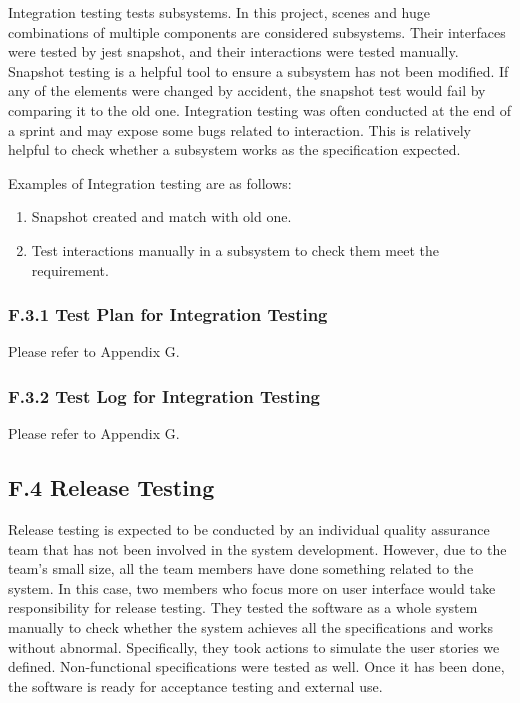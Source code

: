 \documentclass[
]{article}
\begin{document}
Integration testing tests subsystems. In this project, scenes and huge
combinations of multiple components are considered subsystems. Their
interfaces were tested by jest snapshot, and their interactions were
tested manually. Snapshot testing is a helpful tool to ensure a
subsystem has not been modified. If any of the elements were changed by
accident, the snapshot test would fail by comparing it to the old one.
Integration testing was often conducted at the end of a sprint and may
expose some bugs related to interaction. This is relatively helpful to
check whether a subsystem works as the specification expected.

Examples of Integration testing are as follows:

\begin{enumerate}
\def\labelenumi{\arabic{enumi}.}
\item
  Snapshot created and match with old one.
\item
  Test interactions manually in a subsystem to check them meet the
  requirement.
\end{enumerate}

\hypertarget{header-n34}{%
\subsubsection{F.3.1 Test Plan for Integration
Testing}\label{header-n34}}

Please refer to Appendix G.

\hypertarget{header-n36}{%
\subsubsection{F.3.2 Test Log for Integration
Testing}\label{header-n36}}

Please refer to Appendix G.

\hypertarget{header-n39}{%
\subsection{F.4 Release Testing}\label{header-n39}}

Release testing is expected to be conducted by an individual quality
assurance team that has not been involved in the system development.
However, due to the team's small size, all the team members have done
something related to the system. In this case, two members who focus
more on user interface would take responsibility for release testing.
They tested the software as a whole system manually to check whether the
system achieves all the specifications and works without abnormal.
Specifically, they took actions to simulate the user stories we defined.
Non-functional specifications were tested as well. Once it has been
done, the software is ready for acceptance testing and external use.
\end{document}
